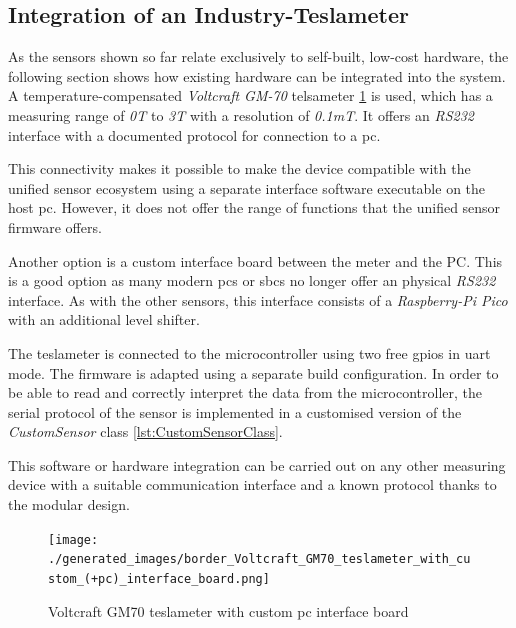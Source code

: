 \hypertarget{integration-of-an-industry-teslameter}{%
\subsection{Integration of an
Industry-Teslameter}\label{integration-of-an-industry-teslameter}}

As the sensors shown so far relate exclusively to self-built, low-cost
hardware, the following section shows how existing hardware can be
integrated into the system. A temperature-compensated \emph{Voltcraft
GM-70} telsameter
\ref{Voltcraft_GM70_teslameter_with_custom_(+pc)_interface_board.png} is
used, which has a measuring range of \emph{0T} to \emph{3T} with a
resolution of \emph{0.1mT}. It offers an \emph{RS232} interface with a
documented protocol for connection to a \gls{pc}.

This connectivity makes it possible to make the device compatible with
the unified sensor ecosystem using a separate interface software
\cite{VoltcraftGM70Rest} executable on the host \gls{pc}. However,
it does not offer the range of functions that the unified sensor
firmware offers.

Another option is a custom interface board between the meter and the PC.
This is a good option as many modern \gls{pc}s or \gls{sbc}s no longer
offer an physical \emph{RS232} interface. As with the other sensors,
this interface consists of a \emph{Raspberry-Pi Pico} with an additional
level shifter.

The teslameter is connected to the microcontroller using two free
\gls{gpio}s in \gls{uart} mode. The firmware is adapted using a separate
build configuration. In order to be able to read and correctly interpret
the data from the microcontroller, the serial protocol of the sensor is
implemented in a customised version of the \emph{CustomSensor} class
\ref{lst:CustomSensorClass}.

This software or hardware integration can be carried out on any other
measuring device with a suitable communication interface and a known
protocol thanks to the modular design.

\begin{figure}
\centering
\texttt{[image: ./generated\_images/border\_Voltcraft\_GM70\_teslameter\_with\_custom\_(+pc)\_interface\_board.png]}
\caption{Voltcraft GM70 teslameter with custom \gls{pc} interface board
\label{Voltcraft_GM70_teslameter_with_custom_(+pc)_interface_board.png}}
\end{figure}

